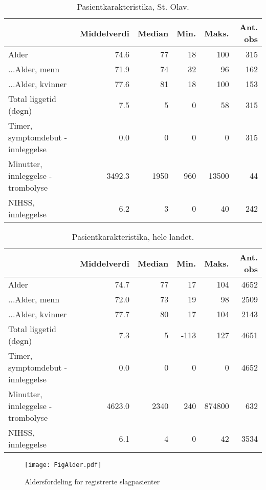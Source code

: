 \documentclass [norsk,a4paper,twoside]{article}\usepackage[]{graphicx}\usepackage[]{color}
\begin{document}
\begin{table}[ht]
\centering
\begin{tabular}{lrrrrr}
  \hline
 & Middelverdi & Median & Min. & Maks. & Ant. obs \\ 
  \hline
Alder & 74.6 & 77 & 18 & 100 & 315 \\ 
  ...Alder, menn & 71.9 & 74 & 32 & 96 & 162 \\ 
  ...Alder, kvinner & 77.6 & 81 & 18 & 100 & 153 \\ 
  Total liggetid (døgn) & 7.5 & 5 & 0 & 58 & 315 \\ 
  Timer, symptomdebut - innleggelse & 0.0 & 0 & 0 & 0 & 315 \\ 
  Minutter, innleggelse - trombolyse & 3492.3 & 1950 & 960 & 13500 & 44 \\ 
  NIHSS, innleggelse & 6.2 & 3 & 0 & 40 & 242 \\ 
   \hline
\end{tabular}
\caption{Pasientkarakteristika, St. Olav.} 
\label{tab:Pasientkarakteristika1}
\end{table}
\begin{table}[ht]
\centering
\begin{tabular}{lrrrrr}
  \hline
 & Middelverdi & Median & Min. & Maks. & Ant. obs \\ 
  \hline
Alder & 74.7 & 77 & 17 & 104 & 4652 \\ 
  ...Alder, menn & 72.0 & 73 & 19 & 98 & 2509 \\ 
  ...Alder, kvinner & 77.7 & 80 & 17 & 104 & 2143 \\ 
  Total liggetid (døgn) & 7.3 & 5 & -113 & 127 & 4651 \\ 
  Timer, symptomdebut - innleggelse & 0.0 & 0 & 0 & 0 & 4652 \\ 
  Minutter, innleggelse - trombolyse & 4623.0 & 2340 & 240 & 874800 & 632 \\ 
  NIHSS, innleggelse & 6.1 & 4 & 0 & 42 & 3534 \\ 
   \hline
\end{tabular}
\caption{Pasientkarakteristika, hele landet.} 
\label{tab:Pasientkarakteristika2}
\end{table}



\begin{figure}[ht]
{\centering \texttt{[image: FigAlder.pdf]} }
\caption{\label{fig:Alder} Aldersfordeling for registrerte slagpasienter}
\end{figure}
\end{document}
